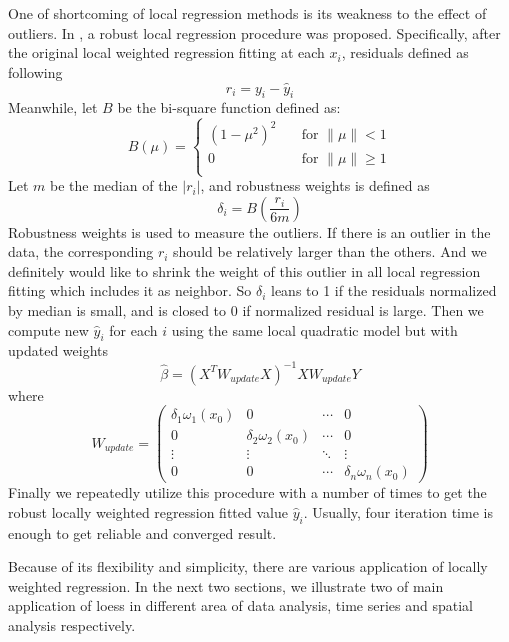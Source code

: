 One of shortcoming of local regression methods is its weakness to the effect of 
outliers. In \cite{Cleveland:1979}, a robust local regression procedure was 
proposed. Specifically, after the original local weighted regression fitting at 
each $x_i$, residuals defined as following 
\begin{equation}
r_i = y_i - \hat y_i
\end{equation}
Meanwhile, let $B$ be the bi-square function defined as:
\begin{equation} 
\label{bisquare}
B(\mu) =
  \begin{cases}
    (1 - \mu^2)^2      & \quad \text{for } \|\mu\| < 1\\
    0  & \quad \text{for } \|\mu\| \ge 1\\
  \end{cases}
\end{equation}
Let $m$ be the median of the $|r_i|$, and robustness weights is defined as
\begin{equation}
\delta_i = B\left(\frac{r_i}{6m}\right)
\end{equation}
Robustness weights is used to measure the outliers. If there is an outlier in 
the data, the corresponding $r_i$ should be relatively larger than the others.
And we definitely would like to shrink the weight of this outlier in all local
regression fitting which includes it as neighbor. So $\delta_i$ leans to 1
if the residuals normalized by median is small, and is closed to 0 if normalized
residual is large. Then we compute new $\hat y_i$ for each $i$ using the same
local quadratic model but with updated weights
\begin{equation}
\hat \beta = (X^TW_{update}X)^{-1}XW_{update}Y
\end{equation}
where
\begin{equation}
W_{update} =  
\begin{pmatrix}
  \delta_1\omega_1(x_0) & 0 & \cdots & 0 \\
  0 & \delta_2\omega_2(x_0) & \cdots & 0 \\
  \vdots  & \vdots & \ddots & \vdots  \\
  0 & 0 & \cdots & \delta_n\omega_n(x_0) 
\end{pmatrix}
\end{equation}
Finally we repeatedly utilize this procedure with a number of times to get
the robust locally weighted regression fitted value $\hat y_i$. Usually, four
iteration time is enough to get reliable and converged result.

Because of its flexibility and simplicity, there are various
application of locally weighted regression. In the next two sections, we illustrate
two of main application of loess in different area of data analysis, time series
and spatial analysis respectively.


